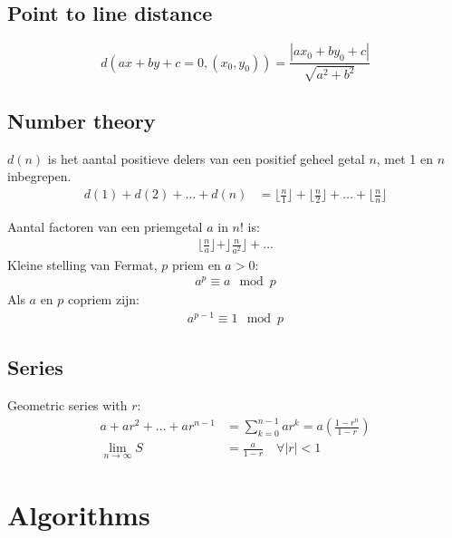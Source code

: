 \documentclass[a4paper, twocolumn]{article}
\begin{document}
\subsection*{Point to line distance}
\begin{equation*}
	d(ax+by+c=0, (x_0, y_0)) = \frac{|ax_0+by_0+c|}{\sqrt{a^2+b^2}}
\end{equation*}
\subsection*{Number theory}
$d(n)$ is het aantal positieve delers van een positief geheel getal $n$, met 1 en $n$ inbegrepen.
\begin{align*}
	d(1) + d(2) + \ldots + d(n) &= \lfloor \frac{n}{1} \rfloor + \lfloor \frac{n}{2} \rfloor + \ldots + \lfloor \frac{n}{n} \rfloor
\end{align*}

Aantal factoren van een priemgetal $a$ in $n!$ is:
\begin{align*}
	\lfloor \frac{n}{a} \rfloor + \rfloor \frac{n}{a^2} \rfloor + \ldots
\end{align*}
Kleine stelling van Fermat, $p$ priem en $a>0$:
\begin{align*}
	a^p \equiv a \mod p
\end{align*}
Als $a$ en $p$ copriem zijn:
\begin{align*}
	a^{p-1} \equiv 1 \mod p
\end{align*}
\subsection*{Series}
Geometric series with $r$:
\begin{align*}
	a + ar^2 + \ldots + ar^{n-1} &= \sum^{n-1}_{k=0} ar^{k} = a\left(\frac{1-r^n}{1-r}\right) \\
	\lim_{n\rightarrow \infty} S &= \frac{a}{1-r} \quad \forall |r| < 1
\end{align*}

\section{Algorithms}

\end{document}
